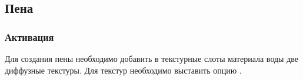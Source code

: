 \documentclass[a4paper,12pt,oneside]{sphinxmanual}
\begin{document}
\subsection{Пена}
\label{outdoor_rendering:id11}

\subsubsection{Активация}
\label{outdoor_rendering:id12}
Для создания пены необходимо добавить в текстурные слоты материала воды две диффузные текстуры. Для текстур необходимо выставить опцию .
\begin{figure}[htbp]
\centering

\end{figure}
\end{document}

